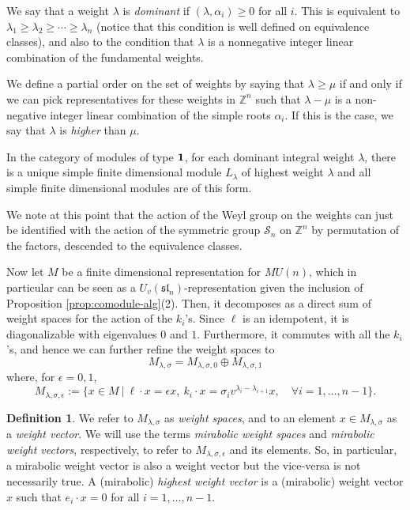 \documentclass{amsart}
\numberwithin{equation}{section}
\theoremstyle{theorem}
\theoremstyle{definition}
\newtheorem{definition}[theorem]{Definition}
\newcommand{\ZZ}{\mathbb{Z}}
\newcommand{\sll}{\mathfrak{sl}}
\newcommand{\uvsln}{U_v(\sll_n)}
\begin{document}
We say that a weight $\lambda$ is \emph{dominant} if $(\lambda,\alpha_i)\geq 0$ for all $i$. This is equivalent to $\lambda_1\geq\lambda_2\geq\cdots\geq\lambda_{n}$ (notice that this condition is well defined on equivalence classes), and also to the condition that $\lambda$ is a nonnegative integer linear combination of the fundamental weights.

We define a partial order on the set of weights by saying that $\lambda\geq \mu$ if and only if we can pick representatives for these weights in $\ZZ^n$ %
such that $\lambda-\mu$ is a non-negative integer linear combination of the simple roots $\alpha_i$. If this is the case, we say that $\lambda$ is \emph{higher} than $\mu$.

In the category of modules of type $\bold{1}$, for each dominant integral weight $\lambda$, 
there is a unique simple finite dimensional module $L_\lambda$ of highest weight $\lambda$ and all simple finite dimensional modules are of this form. 

We note at this point that the action of the Weyl group on the weights can just be identified with the action of the symmetric group $\mathcal{S}_n$ on $\ZZ^n$ by permutation of the factors, descended to the equivalence classes.

Now let $M$ be a finite dimensional representation for $MU(n)$, which in particular can be seen as a $\uvsln$-representation given the inclusion of Proposition \ref{prop:comodule-alg}(2). Then, it decomposes as a direct sum of weight spaces for the action of the $k_i$'s. Since $\ell$ is an idempotent, it is diagonalizable with eigenvalues $0$ and $1$. Furthermore, it commutes with all the $k_i$'s, and hence we can further refine the weight spaces to
$$M_{\lambda,\sigma}=M_{\lambda,\sigma,0}\oplus M_{\lambda,\sigma,1}$$
where, for $\epsilon=0,1$,
$$M_{\lambda,\sigma,\epsilon}:=\{x\in M~|~\ell \cdot x=\epsilon x,~k_i\cdot x=\sigma_i v^{\lambda_i-\lambda_{i+1}}x,\quad\forall i=1,\ldots,n-1\}.$$

\begin{definition}
We refer to $M_{\lambda,\sigma}$ as \emph{weight spaces}, and to an element $x\in M_{\lambda,\sigma}$ as a \emph{weight vector}. We will use the terms \emph{mirabolic weight spaces} and \emph{mirabolic weight vectors}, respectively, to refer to $M_{\lambda,\sigma,\epsilon}$ and its elements. So, in particular, a mirabolic weight vector is also a weight vector but the vice-versa is not necessarily true. A (mirabolic) \emph{highest weight vector} is a (mirabolic) weight vector $x$ such that $e_i\cdot x=0$ for all $i=1,\ldots,n-1$.\end{definition}
\end{document}
